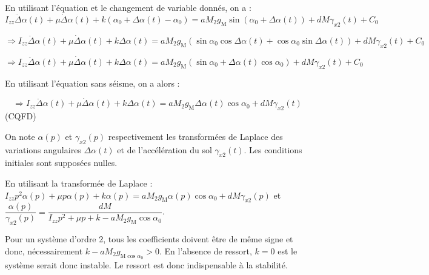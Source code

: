 \ifprof
\begin{corrige}
En utilisant l'équation et le changement de variable donnés, on  a : 
$$I_{z z} \ddot{\Delta}{\alpha}(t)+\mu \dot{\Delta}{\alpha}(t)+k\left(\alpha_{0}+\Delta \alpha(t)-\alpha_{0}\right)=a M_{2} g_{\mathrm{M}} \sin \left(\alpha_{0}+\Delta \alpha(t)\right)+d M \gamma_{x 2}(t)+C_{0}
$$

$$ \Rightarrow 
I_{z z} \ddot{\Delta}{\alpha}(t)+\mu \dot{\Delta}{\alpha}(t)+k\Delta \alpha(t)=a M_{2} g_{\mathrm{M}} \left( 
\sin \alpha_{0} \cos \Delta \alpha(t) + \cos \alpha_{0} \sin \Delta \alpha(t) 
\right)
+d M \gamma_{x 2}(t)+C_{0}
$$


$$ \Rightarrow 
I_{z z} \ddot{\Delta}{\alpha}(t)+\mu \dot{\Delta}{\alpha}(t)+k\Delta \alpha(t)=a M_{2} g_{\mathrm{M}} \left( 
\sin \alpha_{0}  + \Delta \alpha(t) \cos \alpha_{0}  \right)
+d M \gamma_{x 2}(t)+C_{0}
$$

En utilisant l'équation sans séisme, on a alors : 

$$ \Rightarrow 
I_{z z} \ddot{\Delta}{\alpha}(t)+\mu \dot{\Delta}{\alpha}(t)+k\Delta \alpha(t)
=a M_{2} g_{\mathrm{M}} \Delta \alpha(t) \cos \alpha_{0} +d M \gamma_{x 2}(t)
$$
(CQFD)
\end{corrige}
\else
\fi

On note $\alpha(p)$ et $\gamma_{x 2}(p)$ respectivement les transformées de Laplace des variations angulaires $\Delta \alpha(t)$ et de l'accélération du sol $\gamma_{x 2}(t)$. Les conditions initiales sont supposées nulles.

\ifprof
\begin{corrige}
En utilisant la transformée de Laplace : $ 
I_{z z} p^2 {\alpha}(p)+\mu p{\alpha}(p)+k\alpha(p)
=a M_{2} g_{\mathrm{M}} \alpha(p) \cos \alpha_{0} +d M \gamma_{x 2}(p)
$ et 
$\dfrac{\alpha(p)}{\gamma_{x 2}(p)} = \dfrac{d M }{I_{z z} p^2  +\mu p +k -a M_{2} g_{\mathrm{M}}  \cos \alpha_{0}}$.

Pour un système d'ordre 2, tous les coefficients doivent être de même signe et donc, nécessairement 
$k -a M_{2} g_{\mathrm{M}  \cos \alpha_{0}} >0$. En l'absence de ressort, $k=0$ est le système serait donc instable. Le ressort est donc indispensable à la stabilité.
\end{corrige}
\else
\fi

